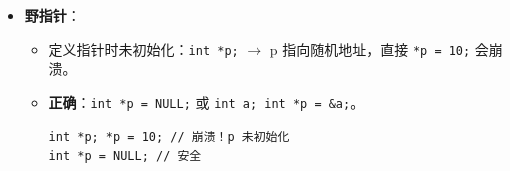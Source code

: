\documentclass[a4paper,12pt]{article}
\begin{document}
\begin{itemize}
\begin{itemize}
\begin{itemize}
            \item 用途：回调函数（如 \texttt{qsort} 的比较函数）。
        \end{itemize}
        \item 详见附录 \hyperref[sec:appendix_ptr_types]{复杂指针类型代码详解}。
    \end{itemize}
    \item \textbf{野指针}：
    \begin{itemize}
        \item 定义指针时未初始化：\texttt{int *p;} $\rightarrow$ p 指向随机地址，直接 \texttt{*p = 10;} 会崩溃。
        \item \textbf{正确}：\texttt{int *p = NULL;} 或 \texttt{int a; int *p = \&a;}。
\begin{lstlisting}
int *p; *p = 10; // 崩溃！p 未初始化
int *p = NULL; // 安全
\end{lstlisting}
    \end{itemize}
\end{itemize}
\end{document}
